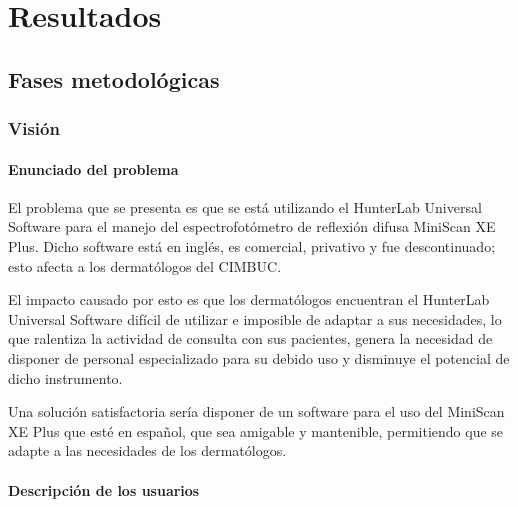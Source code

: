 \chapter{ Resultados}

\section{Fases metodol\'{o}gicas}

\subsection{Visi\'{o}n}
	
	\subsubsection{Enunciado del problema}
	
	El problema que se presenta es que se est\'{a} utilizando el HunterLab Universal Software para el manejo del espectrofot\'{o}metro de reflexi\'{o}n difusa MiniScan XE Plus. Dicho software est\'{a} en ingl\'{e}s, es comercial, privativo y fue descontinuado; esto afecta a los dermat\'{o}logos del CIMBUC.
	
	El impacto causado por esto es que los dermat\'{o}logos encuentran el HunterLab Universal Software dif\'{i}cil de utilizar e imposible de adaptar a sus necesidades, lo que ralentiza la actividad de consulta con sus pacientes, genera la necesidad de disponer de personal especializado para su debido uso y disminuye el potencial de dicho instrumento.
	
	Una soluci\'{o}n satisfactoria ser\'{i}a disponer de un software para el uso del \mbox{MiniScan} XE Plus que est\'{e} en espa\~{n}ol, que sea amigable y mantenible, permitiendo que se adapte a las necesidades de los dermat\'{o}logos.
	
	\subsubsection{Descripci\'{o}n de los usuarios}
	
